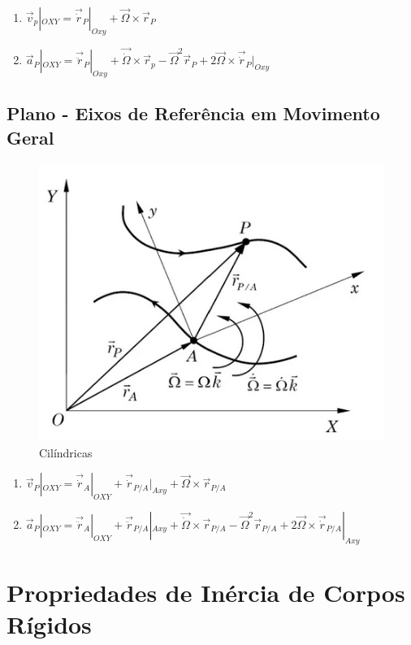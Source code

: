 \documentclass[a4paper, 12pt]{article}
\begin{document}
		\begin{enumerate}
			\item $\vec{v}_p|_{OXY} = \vec{\dot{r}}_P|_{Oxy} + \vec{\Omega}\times\vec{r}_P$
			\item $\vec{a}_P|_{OXY} = \vec{\ddot{r}}_P|_{Oxy} + \vec{\dot{\Omega}}\times \vec{r}_p - \vec{\Omega}^2\vec{r}_P + 2\vec{\Omega}\times \vec{\dot{r}}_P|_{Oxy}$
		\end{enumerate}
		
	\newpage
	\subsection{Plano - Eixos de Referência em Movimento Geral}
		\begin{figure}[h]
			\center
			\includegraphics[scale=0.5]{imagens/ra.png} 
			\caption{Cilíndricas}
		\end{figure}	

		\begin{enumerate}
			\item $\vec{v}_P|_{OXY} = \vec{\dot{r}}_A|_{OXY} + \vec{\dot{r}}_{P/A}|_{Axy} + \vec{\Omega} \times \vec{r}_{P/A}$
			\item $\vec{a}_P|_{OXY} = \vec{\ddot{r}}_A|_{OXY} + \vec{\ddot{r}}_{P/A}|_{Axy} + \vec{\dot{\Omega}}\times \vec{r}_{P/A} - \vec{\Omega}^2\vec{r}_{P/A} + 2\vec{\Omega}\times \vec{\dot{r}}_{P/A}|_{Axy}$
		\end{enumerate}


\section{Propriedades de Inércia de Corpos Rígidos}
\end{document}
